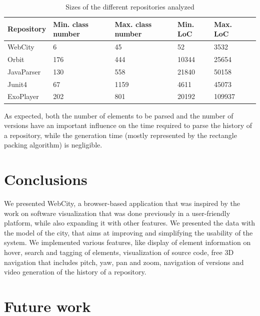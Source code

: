\documentclass[]{usiinfbachelorproject}
\begin{document}
\begin{table}[H]
    \begin{center}
        \begin{tabular}{ | l | l | l | l | l | l |}
        \hline
        Repository & Min. class number & Max. class number & Min. LoC & Max. LoC \\ \hline
        WebCity & 6 & 45 & 52 & 3532 \\ \hline
        Orbit & 176 & 444 & 10344 & 25654 \\ \hline
        JavaParser & 130 & 558 & 21840 & 50158 \\ \hline
        Junit4 & 67 & 1159 & 4611 & 45073 \\ \hline
        ExoPlayer & 202 & 801 & 20192 & 109937 \\ \hline
        \end{tabular}
    \end{center}
    \caption{Sizes of the different repositories analyzed}
    \label{tab:performance2}
\end{table}

As expected, both the number of elements to be parsed and the number of versions have an important influence on the time required to parse the history of a repository, while the generation time (mostly represented by the rectangle packing algorithm) is negligible.


\section{Conclusions} \label{Conclusions}
We presented WebCity, a browser-based application that was inspired by the work on software visualization that was done previously \cite{Wett07b} \cite{Wett2008b} \cite{Wett2008a} in a user-friendly platform, while also expanding it with other features.
We presented the data with the model of the city, that aims at improving and simplifying the usability of the system.
We implemented various features, like display of element information on hover, search and tagging of elements, visualization of source code, free 3D navigation that includes pitch, yaw, pan and zoom, navigation of versions and video generation of the history of a repository.

\section{Future work} \label{Future work}
\end{document}
